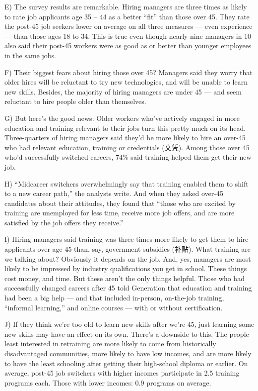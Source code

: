 \documentclass[UTF8,11pt]{ctexart}
\begin{document}
E) The survey results are remarkable. Hiring managers are three times as likely to rate job applicants age 35 – 44 as a better “fit” than those over 45. They rate the post-45 job seekers lower on average on all three measures — even experience — than those ages 18 to 34. This is true even though nearly nine managers in 10 also said their post-45 workers were as good as or better than younger employees in the same jobs.


F) Their biggest fears about hiring those over 45? Managers said they worry that older hires will be reluctant to try new technologies, and will be unable to learn new skills. Besides, the majority of hiring managers are under 45 — and seem reluctant to hire people older than themselves.


G) But here’s the good news. Older workers who’ve actively engaged in more education and training relevant to their jobs turn this pretty much on its head. Three-quarters of hiring managers said they’d be more likely to hire an over-45 who had relevant education, training or credentials (文凭). Among those over 45 who’d successfully switched careers, 74\% said training helped them get their new job.


H) “Midcareer switchers overwhelmingly say that training enabled them to shift to a new career path,” the analysts write. And when they asked over-45 candidates about their attitudes, they found that “those who are excited by training are unemployed for less time, receive more job offers, and are more satisfied by the job offers they receive.”


I) Hiring managers said training was three times more likely to get them to hire applicants over age 45 than, say, government subsidies (补贴). What training are we talking about? Obviously it depends on the job. And, yes, managers are most likely to be impressed by industry qualifications you get in school. These things cost money, and time. But these aren’t the only things helpful. Those who had successfully changed careers after 45 told Generation that education and training had been a big help — and that included in-person, on-the-job training, “informal learning,” and online courses — with or without certification.


J) If they think we’re too old to learn new skills after we’re 45, just learning some new skills may have an effect on its own. There’s a downside to this. The people least interested in retraining are more likely to come from historically disadvantaged communities, more likely to have low incomes, and are more likely to have the least schooling after getting their high-school diploma or earlier. On average, post-45 job switchers with higher incomes participate in 2.5 training programs each. Those with lower incomes: 0.9 programs on average.
\end{document}
